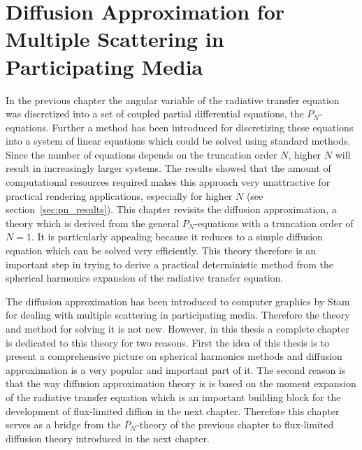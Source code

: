 \chapter{Diffusion Approximation for Multiple Scattering in Participating Media}
%
\label{sec:diffusion_approximation}

In the previous chapter the angular variable of the radiative transfer equation was discretized into a set of coupled partial differential equations, the $P_N$-equations. Further a method has been introduced for discretizing these equations into a system of linear equations which could be solved using standard methods. Since the number of equations depends on the truncation order $N$, higher $N$ will result in increasingly larger systems. The results showed that the amount of computational resources required makes this approach very unattractive for practical rendering applications, especially for higher $N$ (see section~\ref{sec:pn_results}). This chapter revisits the diffusion approximation, a theory which is derived from the general $P_N$-equations with a truncation order of $N=1$. It is particularly appealing because it reduces to a simple diffusion equation which can be solved very efficiently. This theory therefore is an important step in trying to derive a practical deterministic method from the spherical harmonics expansion of the radiative transfer equation.

The diffusion approximation has been introduced to computer graphics by Stam~\cite{Stam95} for dealing with multiple scattering in participating media. Therefore the theory and method for solving it is not new. However, in this thesis a complete chapter is dedicated to this theory for two reasons. First the idea of this thesis is to present a comprehensive picture on spherical harmonics methods and diffusion approximation is a very popular and important part of it. The second reason is that the way diffusion approximation theory is is based on the moment expansion of the radiative transfer equation which is an important building block for the development of flux-limited diffion in the next chapter. Therefore this chapter serves as a bridge from the $P_N$-theory of the previous chapter to flux-limited diffusion theory introduced in the next chapter.

